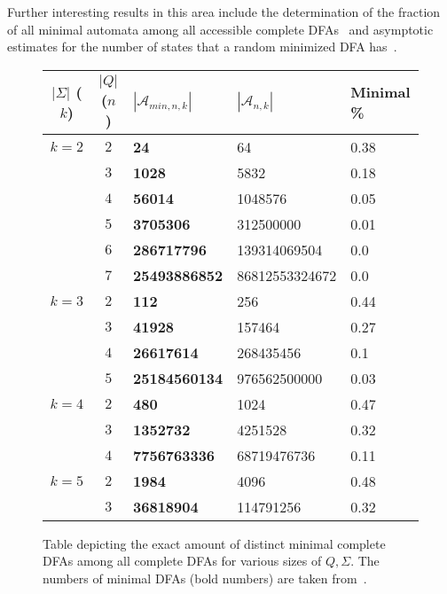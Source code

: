 Further interesting results in this area include the determination of the fraction of all minimal automata among all accessible complete DFAs~\cite{BDS11} and asymptotic estimates for the number of states that a random minimized DFA has~\cite{BK13}.

\begin{figure}[h]
	\centering
	\begin{tabular}{|c|c|l|l|l|}
		\hline
		$|\Sigma|$ ($k$) & $|Q|$ ($n$) & $|\mathcal{A}_{min,n,k}|$ & $|\mathcal{A}_{n,k}|$ & Minimal \% \\\hline
		
		$k = 2$ & $2$ & \textbf{24} & 64 & 0.38 \\
		& $3$ & \textbf{1028} & 5832 & 0.18 \\
		& $4$ & \textbf{56014} & 1048576 & 0.05 \\
		& $5$ & \textbf{3705306} & 312500000 & 0.01 \\
		& $6$ & \textbf{286717796} & 139314069504 & 0.0 \\
		& $7$ & \textbf{25493886852} & 86812553324672 & 0.0 \\\hline
		
		$k = 3$ & $2$ & \textbf{112} & 256 & 0.44 \\
		& $3$ & \textbf{41928} & 157464 & 0.27 \\
		& $4$ & \textbf{26617614} & 268435456 & 0.1 \\
		& $5$ & \textbf{25184560134} & 976562500000 & 0.03 \\\hline
		
		$k = 4$ & $2$ & \textbf{480} & 1024 & 0.47 \\
		& $3$ & \textbf{1352732} & 4251528 & 0.32 \\
		& $4$ & \textbf{7756763336} & 68719476736 & 0.11 \\\hline
		
		$k = 5$ & $2$ & \textbf{1984} & 4096 & 0.48 \\
		& $3$ & \textbf{36818904} & 114791256 & 0.32\\\hline
	\end{tabular}
	\caption{Table depicting the exact amount of distinct minimal complete DFAs among all complete DFAs for various sizes of $Q, \Sigma$. The numbers of minimal DFAs (bold numbers) are taken from~\cite[p. 8]{AMR09}.}
	\label{fig:dfa_minimal_ratios}
\end{figure}
